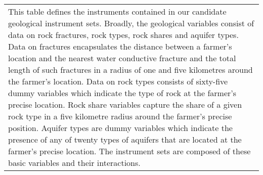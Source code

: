 \begin{table}[htbp]
\begin{tabular}{p{4cm}p{1.5cm}p{1.5cm}p{1.5cm} p{1.5cm} p{1.5cm}}
			\multicolumn{6}{p{0.85\hsize}}{\footnotesize This table defines the instruments contained in our candidate geological instrument sets. Broadly, the geological variables consist of data on rock fractures, rock types, rock shares and aquifer types. Data on fractures encapsulates the distance between a farmer's location and the nearest water conductive fracture and the total length of such fractures in a radius of one and five kilometres around the farmer's location. Data on rock types consists of sixty-five dummy variables which indicate the type of rock  at the farmer's precise location. Rock share variables capture the share of a given rock type in a five kilometre radius around the farmer's precise position. Aquifer types are dummy variables which indicate the presence of any of twenty types of aquifers that are located at the farmer's precise location. The instrument sets are composed of these basic variables and their interactions. }
		\end{tabular}
	
		
\end{table}